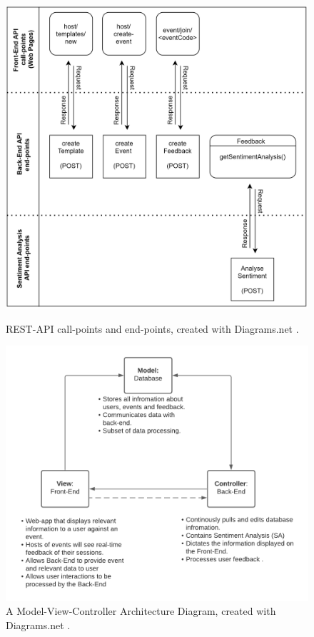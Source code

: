 \documentclass[9pt, titlepage]{extarticle}
\begin{document}
\begin{figure}[!h]
  \centering
  \begin{minipage}[b]{0.49\textwidth}
    \includegraphics[width=\textwidth]{assets/REST_API.png}
    \caption{REST-API call-points and end-points, created with Diagrams.net \autocite{web:drawio}.}
\label{fig:apis}
  \end{minipage}
  \hfill
  \begin{minipage}[b]{0.49\textwidth}
    \includegraphics[width=\textwidth]{assets/mvc.png}
    \caption{A Model-View-Controller Architecture Diagram, created with Diagrams.net \autocite{web:drawio}.}
  \label{fig:mvc-diagram}
  \end{minipage}
\end{figure}
\end{document}
